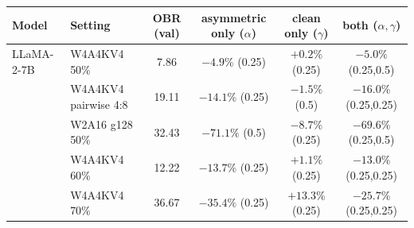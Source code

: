 \begin{tabular}{llcccc}
\toprule
Model & Setting & OBR (val) & asymmetric only ($\alpha$) & clean only ($\gamma$) & both ($\alpha,\gamma$) \\
\midrule
LLaMA-2-7B & W4A4KV4 50\% & 7.86 & $-4.9\%$ (0.25) & $+0.2\%$ (0.25) & $\mathbf{-5.0\%}$ (0.25,0.5) \\
 & W4A4KV4 pairwise 4:8 & 19.11 & $-14.1\%$ (0.25) & $-1.5\%$ (0.5) & $\mathbf{-16.0\%}$ (0.25,0.25) \\
 & W2A16 g128 50\% & 32.43 & $\mathbf{-71.1\%}$ (0.5) & $-8.7\%$ (0.25) & $-69.6\%$ (0.25,0.5) \\
 & W4A4KV4 60\% & 12.22 & $\mathbf{-13.7\%}$ (0.25) & $+1.1\%$ (0.25) & $-13.0\%$ (0.25,0.25) \\
 & W4A4KV4 70\% & 36.67 & $\mathbf{-35.4\%}$ (0.25) & $+13.3\%$ (0.25) & $-25.7\%$ (0.25,0.25) \\
\bottomrule
\end{tabular}
